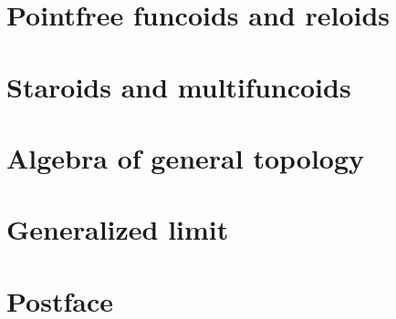 \documentclass[a4paper,oneside,english,reqno]{amsbook}
\numberwithin{section}{chapter}
\begin{document}
\part{Pointfree funcoids and reloids}



\part{Staroids and multifuncoids}



\part{Algebra of general topology}



\part{Generalized limit}



\part{Postface}






\printindex{}




\addtocounter{figure}{-1}
\label{LASTFIGURE}
\end{document}
